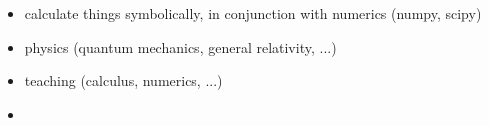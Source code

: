 \documentclass[handout]{beamer}
\begin{document}
\begin{frame}[fragile]
\begin{columns}
\begin{column}[r]{0.5\textwidth}
\begin{itemize}
                    \begin{itemize}
                        \item calculate things symbolically, in conjunction
with numerics (numpy, scipy)
                        \item physics (quantum mechanics, general relativity, ...)
                        \item teaching (calculus, numerics, ...)
                        \item \structure{\ldots}
                    \end{itemize}
            \end{itemize}
        \end{column}
    \end{columns}
\end{frame}
\end{document}
